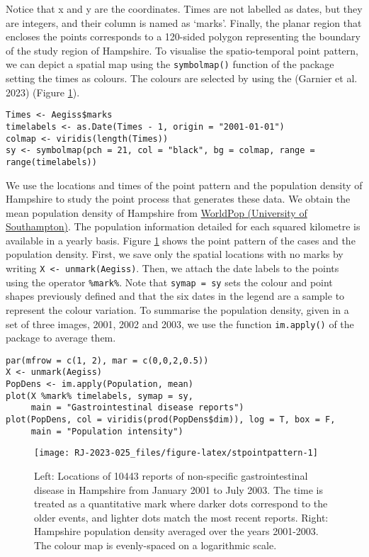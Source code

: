 Notice that x and y are the coordinates. Times are not labelled as dates, but they are integers, and their column is named as `marks'. Finally, the planar region that encloses the points corresponds to a 120-sided polygon representing the boundary of the study region of Hampshire. To visualise the spatio-temporal point pattern, we can depict a spatial map using the \texttt{symbolmap()} function of the  package setting the times as colours. The colours are selected by using the  (Garnier et al. 2023) (Figure \ref{fig:stpointpattern}).

\begin{verbatim}
Times <- Aegiss$marks
timelabels <- as.Date(Times - 1, origin = "2001-01-01")
colmap <- viridis(length(Times))
sy <- symbolmap(pch = 21, col = "black", bg = colmap, range = range(timelabels))
\end{verbatim}

We use the locations and times of the point pattern and the population density of Hampshire to study the point process that generates these data. We obtain the mean population density of Hampshire from \href{https://www.worldpop.org/}{WorldPop (University of Southampton)}. The population information detailed for each squared kilometre is available in a yearly basis. Figure \ref{fig:stpointpattern} shows the point pattern of the cases and the population density. First, we save only the spatial locations with no marks by writing \texttt{X\ \textless{}-\ unmark(Aegiss)}. Then, we attach the date labels to the points using the operator \texttt{\%mark\%}. Note that \texttt{symap\ =\ sy} sets the colour and point shapes previously defined and that the six dates in the legend are a sample to represent the colour variation. To summarise the population density, given in a set of three images, 2001, 2002 and 2003, we use the function \texttt{im.apply()} of the package  to average them.

\begin{verbatim}
par(mfrow = c(1, 2), mar = c(0,0,2,0.5)) 
X <- unmark(Aegiss)
PopDens <- im.apply(Population, mean)
plot(X %mark% timelabels, symap = sy, 
     main = "Gastrointestinal disease reports")
plot(PopDens, col = viridis(prod(PopDens$dim)), log = T, box = F,
     main = "Population intensity")
\end{verbatim}

\begin{figure}

{\centering \texttt{[image: RJ-2023-025\_files/figure-latex/stpointpattern-1]} 

}

\caption{Left: Locations of 10443 reports of non-specific gastrointestinal disease in Hampshire from January 2001 to July 2003. The time is treated as a quantitative mark where darker dots correspond to the older events, and lighter dots match the most recent reports. Right: Hampshire population density averaged over the years 2001-2003. The colour map is evenly-spaced on a logarithmic scale.}\label{fig:stpointpattern}
\end{figure}

